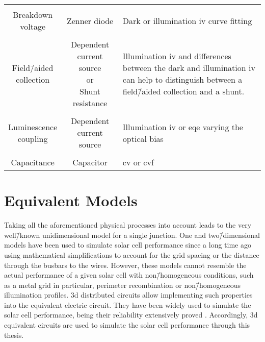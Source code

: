 \begin{table}[ht]
\begin{tabularx}{\textwidth}{ccX}
	 \\[-1em]\hdashline
	 \\[-1em]
	 \makecell{Breakdown\\voltage} &
	 Zenner diode &
	 Dark or illumination \gls{iv} curve fitting\\
	 \\[-1em]
	 \makecell{Field\=/aided\\collection} &
	 \makecell{Dependent current source\\or\\Shunt resistance} &
	 Illumination \gls{iv} and differences between the dark and illumination \gls{iv} can help to distinguish between a field\=/aided collection and a shunt.\\
	 \\[-1em]
	 \makecell{Luminescence\\coupling} &
	 \makecell{Dependent \\ current source} &
	 Illumination \gls{iv} or \gls{eqe} varying the optical bias\\
	 \\[-1em]
	 Capacitance &
	 Capacitor &
	 \gls{cv} or \gls{cvf}\\
	\bottomrule[\thickbottomline]
	\end{tabularx}
\end{table}

\section{Equivalent Models}
Taking all the aforementioned physical processes into account leads to the very well\=/known unidimensional model for a single junction. One and two\=/dimensional models have been used to simulate solar cell performance since a long time ago \cite{Rey-Stolle2002} using mathematical simplifications to account for the grid spacing or the distance through the busbars to the wires. However, these models cannot resemble the actual performance of a given solar cell with non\=/homogeneous conditions, such as a metal grid in particular, perimeter recombination or non\=/homogeneous illumination profiles. \gls{3d} distributed circuits allow implementing such properties into the equivalent electric circuit. They have been widely used to simulate the solar cell performance, being their reliability extensively proved \cite{Galiana2006,Garcia2008,Espinet-Gonzalez2015,Espinet2011,EspinetGonzalez2012,GarciaVara2010}. Accordingly, \gls{3d} equivalent circuits are used to simulate the solar cell performance through this thesis. 

